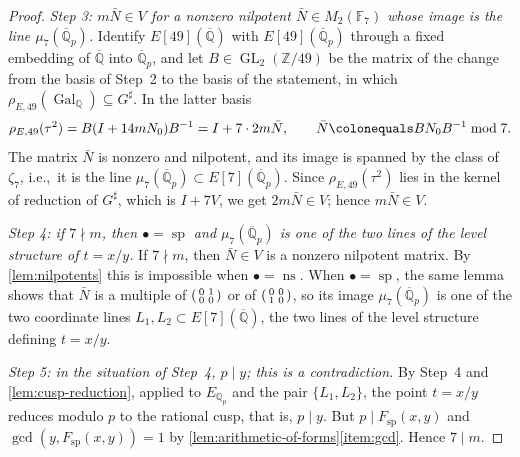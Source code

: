\documentclass[12pt]{amsart}
\newcommand{\F}{{\mathbb F}}
\newcommand{\Q}{\mathbb{Q}}
\newcommand{\Z}{\mathbb{Z}}
\newcommand{\Qbar}{{\overline{\Q}}}
\DeclareMathOperator{\ns}{ns}
\DeclareMathOperator{\spc}{sp}
\DeclareMathOperator{\Gal}{Gal}
\newcommand{\GL}{\operatorname{GL}}
\numberwithin{equation}{section}
\theoremstyle{definition}
\begin{document}
\begin{proof}
  \emph{Step 3: $m\bar N \in V$ for a nonzero nilpotent
    $\bar N \in M_2(\F_7)$ whose image is the line $\mu_7(\Qbar_p)$.} Identify
  $E[49](\Qbar)$ with $E[49](\Qbar_p)$ through a fixed embedding of $\Qbar$
  into $\Qbar_p$, and let $B \in \GL_2(\Z/49)$ be the matrix of the
  change from the basis of Step~2 to the basis of the statement, in which
  $\rho_{E,49}(\Gal_{\Q}) \subseteq G^{\sharp}$. In the latter
  basis
  \[
    \rho_{E,49}(\tau^2) = B(I + 14mN_0)B^{-1} = I + 7\cdot 2m\bar N,
    \qquad
    \bar N \colonequals BN_0B^{-1} \bmod 7 .
  \]
  The matrix $\bar N$ is nonzero and nilpotent, and its image is spanned by the
  class of $\zeta_7$, i.e.,~it is the line $\mu_7(\Qbar_p) \subset
  E[7](\Qbar_p)$. Since $\rho_{E,49}(\tau^2)$ lies in the kernel of reduction of
  $G^{\sharp}$, which is $I + 7V$, we get
  $2m\bar N \in V$; hence $m\bar N \in V$.

  \emph{Step 4: if $7 \nmid m$, then $\bullet = \spc$ and $\mu_7(\Qbar_p)$ is one
    of the two lines of the level structure of $t = x/y$.} If $7 \nmid m$, then
  $\bar N \in V$ is a nonzero nilpotent matrix. By
  \cref{lem:nilpotents} this is impossible when $\bullet = \ns$. When $\bullet =
  \spc$, the same lemma shows that $\bar N$ is a multiple of
  $\begin{psmallmatrix*}[r] 0 & 1 \\ 0 & 0\end{psmallmatrix*}$ or of
  $\begin{psmallmatrix*}[r] 0 & 0 \\ 1 & 0\end{psmallmatrix*}$, so its image
  $\mu_7(\Qbar_p)$ is one of the two coordinate lines $L_1, L_2 \subset
  E[7](\Qbar)$, the two lines of the level structure defining $t = x/y$.

  \emph{Step 5: in the situation of Step~4, $p \mid y$; this is a contradiction.}
  By Step~4 and \cref{lem:cusp-reduction}, applied to $E_{\Q_p}$ and the pair
  $\{L_1,L_2\}$, the point $t = x/y$ reduces modulo $p$ to the rational cusp,
  that is, $p \mid y$. But $p \mid F_{\spc}(x,y)$ and $\gcd(y, F_{\spc}(x,y)) = 1$
  by \cref{lem:arithmetic-of-forms}\eqref{item:gcd}. Hence $7 \mid m$.
\end{proof}
\end{document}
